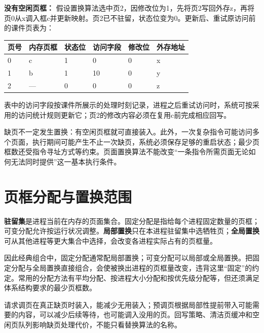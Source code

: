 \textbf{没有空闲页框：} 假设置换算法选中页2，因修改位为1，先将页2写回外存z，再将页0从x调入框c并更新映射。页2已不驻留，状态位变为0。更新后、重试原访问前的课件页表为：

\begin{wideblock}\par\medskip\noindent\begin{minipage}{\linewidth}\fontsize{9.3}{12}\selectfont\begin{tabularx}{\linewidth}{@{}YYYYYY@{}}
\toprule\noalign{}
页号 & 内存页框 & 状态位 & 访问字段 & 修改位 & 外存地址 \\
\midrule\noalign{}


0 & c & 1 & 0 & 0 & x \\
1 & b & 1 & 10 & 0 & y \\
2 & --- & 0 & 0 & 0 & z \\
\bottomrule\end{tabularx}
\end{minipage}\par\medskip\end{wideblock}

表中的访问字段按课件所展示的处理时刻记录，进程之后重试访问时，系统可按采用的访问统计规则更新它；页2的修改内容必须在复用c前完成相应回写。

缺页不一定发生置换：有空闲页框就可直接装入。此外，一次复杂指令可能访问多个页面，执行期间可能产生不止一次缺页，系统必须保存足够的重启状态；最少页框数还受指令寻址方式等约束。页面置换算法不能改变``一条指令所需页面无论如何无法同时提供''这一基本执行条件。

\section{页框分配与置换范围}\label{OS03-5-8}

\textbf{驻留集}是进程当前在内存的页面集合。固定分配是指给每个进程固定数量的页框；可变分配允许按运行状况调整。\textbf{局部置换}只在本进程驻留集中选牺牲页；\textbf{全局置换}可从其他进程等更大集合中选择，会改变各进程实际占有的页框量。

因此经典组合中，固定分配通常配局部置换；可变分配可以局部或全局置换。把固定分配与全局置换直接组合，会使被换出进程的页框量改变，违背这里``固定''的约定。常用的分配方法有平均分配、按进程大小分配和按优先级分配等，但还须满足体系结构要求的最少页框数。

请求调页在真正缺页时装入，能减少无用装入；预调页根据局部性提前带入可能需要的内容，可以减少后续等待，也可能调入没用的页。回写策略、清洁页缓冲和空闲页队列影响缺页处理代价，不能只看替换算法的名称。


